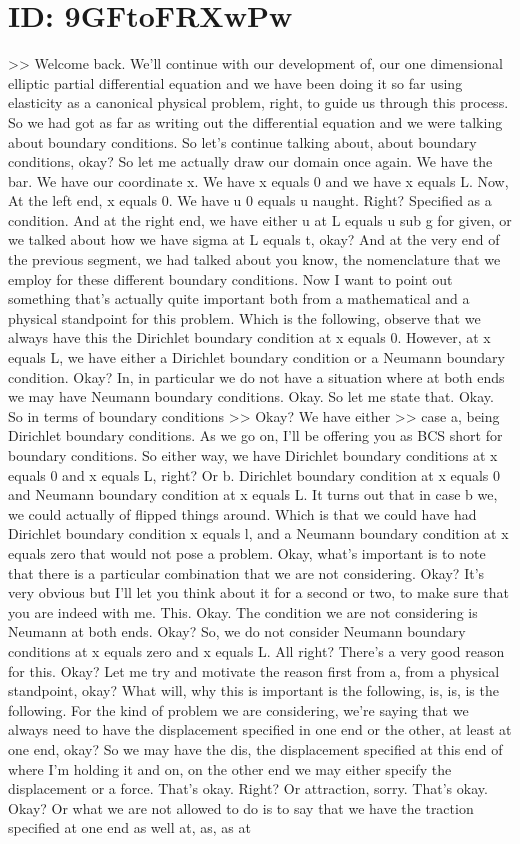 \documentclass[10pt]{article}
\begin{document}
\section*{ID: 9GFtoFRXwPw}
>> Welcome back. We'll continue with our development of, our one dimensional elliptic partial differential equation and we have been doing it so far using elasticity as a canonical physical problem, right, to guide us through this process. So we had got as far as writing out the differential equation and we were talking about boundary conditions. So let's continue talking about, about boundary conditions, okay? So let me actually draw our domain once again. We have the bar. We have our coordinate x. We have x equals 0 and we have x equals L. Now, At the left end, x equals 0. We have u 0 equals u naught. Right? Specified as a condition. And at the right end, we have either u at L equals u sub g for given, or we talked about how we have sigma at L equals t, okay? And at the very end of the previous segment, we had talked about you know, the nomenclature that we employ for these different boundary conditions. Now I want to point out something that's actually quite important both from a mathematical and a physical standpoint for this problem. Which is the following, observe that we always have this the Dirichlet boundary condition at x equals 0. However, at x equals L, we have either a Dirichlet boundary condition or a Neumann boundary condition. Okay? In, in particular we do not have a situation where at both ends we may have Neumann boundary conditions. Okay. So let me state that. Okay. So in terms of boundary conditions >> Okay? We have either >> case a, being Dirichlet boundary conditions. As we go on, I'll be offering you as BCS short for boundary conditions. So either way, we have Dirichlet boundary conditions at x equals 0 and x equals L, right? Or b. Dirichlet boundary condition at x equals 0 and Neumann boundary condition at x equals L. It turns out that in case b we, we could actually of flipped things around. Which is that we could have had Dirichlet boundary condition x equals l, and a Neumann boundary condition at x equals zero that would not pose a problem. Okay, what's important is to note that there is a particular combination that we are not considering. Okay? It's very obvious but I'll let you think about it for a second or two, to make sure that you are indeed with me. This. Okay. The condition we are not considering is Neumann at both ends. Okay? So, we do not consider Neumann boundary conditions at x equals zero and x equals L. All right? There's a very good reason for this. Okay? Let me try and motivate the reason first from a, from a physical standpoint, okay? What will, why this is important is the following, is, is, is the following. For the kind of problem we are considering, we're saying that we always need to have the displacement specified in one end or the other, at least at one end, okay? So we may have the dis, the displacement specified at this end of where I'm holding it and on, on the other end we may either specify the displacement or a force. That's okay. Right? Or attraction, sorry. That's okay. Okay? Or what we are not allowed to do is to say that we have the traction specified at one end as well at, as, as at 
\end{document}
